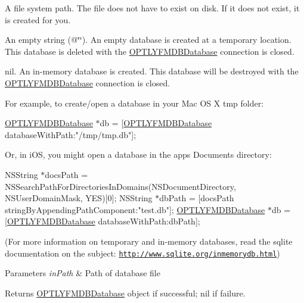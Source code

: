 \begin{DoxyEnumerate}
\item A file system path. The file does not have to exist on disk. If it does not exist, it is created for you.
\item An empty string ({\ttfamily @\char`\"{}\char`\"{}}). An empty database is created at a temporary location. This database is deleted with the {\ttfamily \mbox{\hyperlink{interface_o_p_t_l_y_f_m_d_b_database}{O\+P\+T\+L\+Y\+F\+M\+D\+B\+Database}}} connection is closed.
\item {\ttfamily nil}. An in-\/memory database is created. This database will be destroyed with the {\ttfamily \mbox{\hyperlink{interface_o_p_t_l_y_f_m_d_b_database}{O\+P\+T\+L\+Y\+F\+M\+D\+B\+Database}}} connection is closed.
\end{DoxyEnumerate}

For example, to create/open a database in your Mac OS X {\ttfamily tmp} folder\+:

\mbox{\hyperlink{interface_o_p_t_l_y_f_m_d_b_database}{O\+P\+T\+L\+Y\+F\+M\+D\+B\+Database}} $\ast$db = \mbox{[}\mbox{\hyperlink{interface_o_p_t_l_y_f_m_d_b_database}{O\+P\+T\+L\+Y\+F\+M\+D\+B\+Database}} database\+With\+Path\+:"/tmp/tmp.db"\mbox{]};

Or, in i\+OS, you might open a database in the app\textquotesingle{}s {\ttfamily Documents} directory\+:

N\+S\+String $\ast$docs\+Path = N\+S\+Search\+Path\+For\+Directories\+In\+Domains(\+N\+S\+Document\+Directory, N\+S\+User\+Domain\+Mask, Y\+E\+S)\mbox{[}0\mbox{]}; N\+S\+String $\ast$db\+Path = \mbox{[}docs\+Path string\+By\+Appending\+Path\+Component\+:"test.\+db"\mbox{]}; \mbox{\hyperlink{interface_o_p_t_l_y_f_m_d_b_database}{O\+P\+T\+L\+Y\+F\+M\+D\+B\+Database}} $\ast$db = \mbox{[}\mbox{\hyperlink{interface_o_p_t_l_y_f_m_d_b_database}{O\+P\+T\+L\+Y\+F\+M\+D\+B\+Database}} database\+With\+Path\+:db\+Path\mbox{]};

(For more information on temporary and in-\/memory databases, read the sqlite documentation on the subject\+: \href{http://www.sqlite.org/inmemorydb.html}{\tt http\+://www.\+sqlite.\+org/inmemorydb.\+html})


\begin{DoxyParams}{Parameters}
{\em in\+Path} & Path of database file\\
\hline
\end{DoxyParams}
\begin{DoxyReturn}{Returns}
{\ttfamily \mbox{\hyperlink{interface_o_p_t_l_y_f_m_d_b_database}{O\+P\+T\+L\+Y\+F\+M\+D\+B\+Database}}} object if successful; {\ttfamily nil} if failure. 
\end{DoxyReturn}
\mbox{\label{interface_o_p_t_l_y_f_m_d_b_database_a13bb79efcda5db13674420ac4f805dd5}} 
